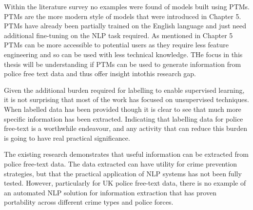 Within the literature survey no examples were found of models built using PTMs. PTMs are the more modern style of models that were introduced in Chapter 5. PTMs have already been partially trained on the English language and just need additional fine-tuning on the NLP task required.  As mentioned in Chapter 5 PTMs can be more accessible to potential users as they require less feature engineering and so can be used with less technical knowledge. THe focus in this thesis will be understanding if PTMs can be used to generate information from police free text data and thus offer insight intothis research gap.

Given the additional burden required for labelling to enable supervised learning, it is not surprising that most of the work has focused on unsupervised techniques. When labelled data has been provided though it is clear to see that much more specific information has been extracted. Indicating that labelling data for police free-text is a worthwhile endeavour, and any activity that can reduce this burden is going to have real practical significance. 

The existing research demonstrates that useful information can be extracted from police free-text data. The data extracted can have utility for crime prevention strategies, but that the practical application of NLP systems has not been fully tested. However, particularly for UK police free-text data, there is no example of an automated NLP solution for information extraction that has proven portability across different crime types and police forces.  


